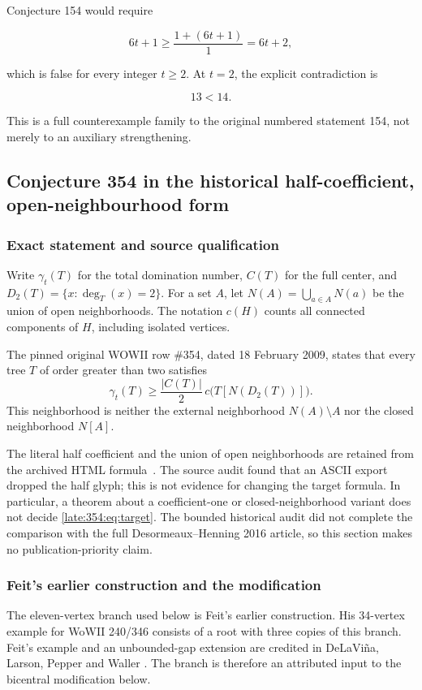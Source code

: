 \documentclass[11pt,a4paper]{article}
\theoremstyle{definition}\newtheorem{definition}[theorem]{Definition}
\theoremstyle{remark}\newtheorem{remark}[theorem]{Remark}
\begin{document}
Conjecture 154 would require

\[6t+1\geq\frac{1+(6t+1)}1=6t+2,\]

which is false for every integer \(t\geq2\). At \(t=2\), the explicit
contradiction is

\[\boxed{13<14.}\]

This is a full counterexample family to the original numbered
statement 154, not merely to an auxiliary strengthening.


\subsection{Conjecture 354 in the historical half-coefficient, open-neighbourhood form}\label{late:354}

\subsubsection{Exact statement and source qualification}
Write $\gamma_t(T)$ for the total domination number, $C(T)$ for the full center, and $D_2(T)=\{x:\deg_T(x)=2\}$. For a set $A$, let $N(A)=\bigcup_{a\in A}N(a)$ be the union of open neighborhoods. The notation $c(H)$ counts all connected components of $H$, including isolated vertices.

The pinned original WOWII row \#354, dated 18 February 2009, states that every tree $T$ of order greater than two satisfies
\begin{equation}
\gamma_t(T)\ge \frac{|C(T)|}{2}\,c\bigl(T[N(D_2(T))]\bigr).
\label{late:354:eq:target}
\end{equation}
This neighborhood is neither the external neighborhood $N(A)\setminus A$ nor the closed neighborhood $N[A]$.

The literal half coefficient and the union of open neighborhoods are
retained from the archived HTML formula~\cite{src:catalogue}. The source
audit found that an ASCII export dropped the half glyph; this is not
evidence for changing the target formula. In particular, a theorem about
a coefficient-one or closed-neighborhood variant does not decide
\eqref{late:354:eq:target}. The bounded historical audit did not complete
the comparison with the full Desormeaux--Henning 2016 article, so this
section makes no publication-priority claim.

\subsubsection{Feit's earlier construction and the modification}
The eleven-vertex branch used below is Feit's earlier construction.
His 34-vertex example for WoWII 240/346 consists of a root with three
copies of this branch. Feit's example and an unbounded-gap extension
are credited in DeLaVi\~na, Larson, Pepper and Waller
\cite[p.~7 of the author manuscript]{late:totaldom}. The branch is
therefore an attributed input to the bicentral modification below.
\end{document}
